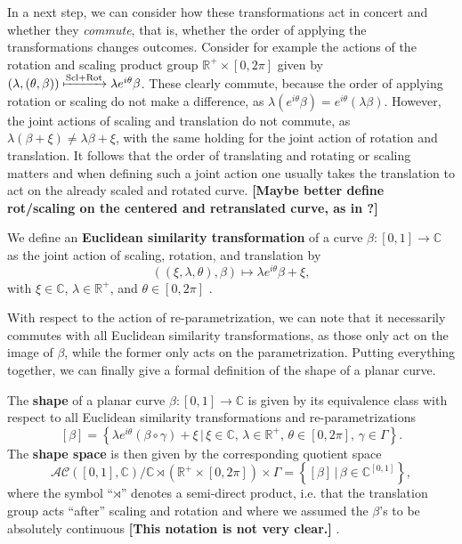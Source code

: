In a next step, we can consider how these transformations act in concert and whether they \textit{commute}, that is, whether the order of applying the transformations changes outcomes.
Consider for example the actions of the rotation and scaling product group $\mathbb{R}^+ \times [0,2\pi]$ given by $(\lambda, (\theta, \beta)) \xmapsto{\text{Scl} + \text{Rot}} \lambda e^{i\theta} \beta$.
These clearly commute, because the order of applying rotation or scaling do not make a difference, as $\lambda(e^{i\theta}\beta) = e^{i\theta}(\lambda\beta)$.
However, the joint actions of scaling and translation do not commute, as $\lambda(\beta + \xi) \neq \lambda\beta + \xi$, with the same holding for the joint action of rotation and translation.
It follows that the order of translating and rotating or scaling matters and when defining such a joint action one usually takes the translation to act on the already scaled and rotated curve.
\textbf{[Maybe better define rot/scaling on the centered and retranslated curve, as in \cite{Stoecker2021}?]}

\begin{definition} 
  We define an \textbf{Euclidean similarity transformation} of a curve $\beta :
  [0,1] \rightarrow \mathbb{C}$ as the joint action of scaling, rotation, and
  translation by 
  $$((\xi, \lambda, \theta), \beta) \mapsto \lambda e^{i\theta} \beta + \xi,$$
  with $\xi \in \mathbb{C}$, $\lambda \in \mathbb{R}^+$, and $\theta \in
  [0,2\pi]$ \parencite[see][62]{DrydenMardia2016}.
\end{definition}

\noindent With respect to the action of re-parametrization, we can note that it
necessarily commutes with all Euclidean similarity transformations, as those
only act on the image of $\beta$, while the former only acts on the
parametrization.
Putting everything together, we can finally give a formal definition of the
shape of a planar curve.

\begin{definition}[Shape]
  The \textbf{shape} of a planar curve $\beta : [0,1] \rightarrow \mathbb{C}$
  is given by its equivalence class with respect to all Euclidean similarity
  transformations and re-parametrizations
  $$ [\beta] = \left\{\lambda e^{i\theta}(\beta \circ \gamma) + \xi\,|\, \xi
  \in \mathbb{C},\, \lambda \in \mathbb{R}^+,\, \theta \in [0,2\pi],\, \gamma
  \in \Gamma\right\}. $$
  The \textbf{shape space} is then given by the corresponding quotient space 
  $$\mathcal{AC}([0,1], \mathbb{C}) \big/ \mathbb{C} \rtimes \left( \mathbb{R}^+ \times
  [0,2\pi] \right) \times \Gamma = \left\{[\beta]\,|\,\beta \in
  \mathbb{C}^{[0,1]}\right\},$$
  where the symbol \enquote{$\rtimes$} denotes a semi-direct product, i.e. that
  the translation group acts \enquote{after} scaling and rotation and where we assumed the $\beta$'s to be absolutely continuous \textbf{[This notation is not very clear.]}
  \parencite[for details see][Chapter 3]{SrivastavaKlassen2016}.
\end{definition}

